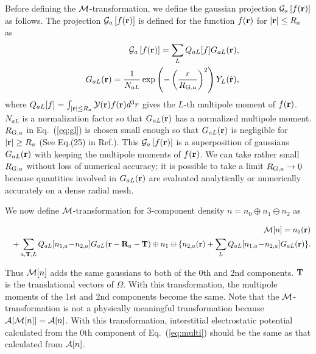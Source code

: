 \documentclass[a4paper,10pt,aip,onecolumn,amsmath,amssymb,floatfix,rmp]{revtex4-1}
\newcommand{\bfr}{{\bf r}}
\newcommand{\bfT}{{\bf T}}
\newcommand{\bfR}{{\bf R}}
\newcommand{\YY}{{\cal Y}}
\newcommand{\GG}{{\cal G}}
\newcommand{\ooplus}{\oplus}
\newcommand{\oominus}{\ominus}
\def\calR{{\cal A}}
\newcommand{\req}[1]{\mbox{Eq.~\!(\ref{#1})}}
\def\RGSa{R_{{\rm G},a}}
\def\MM{{\cal M}}
\def\intaa{\int_{|\bfr|\leq R_a}}
\begin{document}
\begin{widetext}
Before defining the $\MM$-transformation, we define the gaussian
projection $\GG_a \left[f(\bfr)\right]$ as follows.  The projection
$\GG_a \left[f(\bfr)\right]$ is defined for the function $f(\bfr)$ for
$|\bfr|\leq R_a$ as
\begin{eqnarray}
&&\GG_a \left[f(\bfr)\right]
=\sum_L Q_{aL}[f] G_{aL}(\bfr), \label{eq:gdef} \\
&&G_{aL}(\bfr)= \frac{1}{N_{aL}} \exp\left(-\left(\frac{r}{\RGSa}\right)^2\right)
Y_L(\hat{\bfr}),\label{eq:gl}
\end{eqnarray}
where $Q_{aL}[f]=\intaa \YY(\bfr) f(\bfr) d^3r$
gives the $L$-th multipole moment of $f(\bfr)$.
$N_{aL}$ is a normalization factor
so that $G_{aL}(\bfr)$ has a normalized multipole moment.
$\RGSa$ in \req{eq:gl} is chosen small enough so that $G_{aL}(\bfr)$ is
negligible for $|\bfr|\geq R_a$ (See Eq.(25) in
Ref.\cite{lmfchap}). This $\GG_a \left[f(\bfr)\right]$ is a
superposition of gaussians $G_{aL}(\bfr)$ with keeping the multipole
moments of $f(\bfr)$.  We can take rather small $\RGSa$ without loss of
numerical accuracy; it is possible to take a limit $\RGSa \to 0$ because
quantities involved in $G_{aL}(\bfr)$ are evaluated analytically or
numerically accurately on a dense radial mesh.

We now define $\MM$-transformation for
3-component density $n= n_0 \ooplus n_1 \oominus n_2$ as
\begin{widetext}
\begin{eqnarray}
&&\MM[n]=  n_0(\bfr) \nonumber \\
&&+ \sum_{a,\bfT,L} Q_{aL}[n_{1,a}\!-\!n_{2,a}]G_{aL}(\bfr-\bfR_a-\bfT) 
\ooplus n_{1} \oominus 
\{n_{2,a}(\bfr) + \sum_L Q_{aL}[n_{1,a}\!-\!n_{2,a}]G_{aL}(\bfr) \}. \label{eq:multi}
\end{eqnarray}
\end{widetext}
Thus $\MM[n]$ adds the same gaussians to both of the 0th and 2nd
components.  $\bfT$ is the translational vectors of $\Omega$.  With this
transformation, the multipole moments of the 1st and 2nd components become
the same.  Note that the $\MM$-transformation is not a physically
meaningful transformation because $\calR[\MM[n]]=\calR[n]$.  With this
transformation, interstitial electrostatic potential calculated from the
0th component of \req{eq:multi} should be the same as that calculated
from $\calR[n]$.


\end{widetext}
\end{document}
